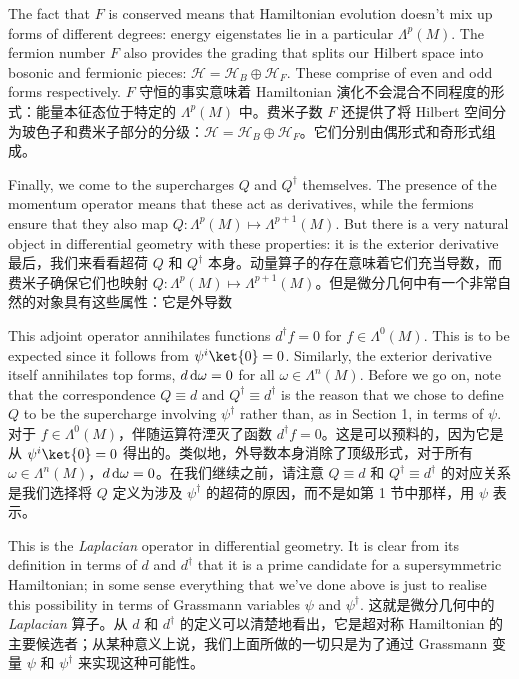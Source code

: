 \documentclass{article}
\begin{document}
\begin{paracol}{2}
The fact that $F$ is conserved means that Hamiltonian evolution doesn’t mix up forms of different degrees: energy eigenstates lie in a particular $\Lambda^{p}(M)$. The fermion number $F$ also provides the grading that splits our Hilbert space into bosonic and fermionic pieces: $\mathcal{H} = \mathcal{H}_B \oplus \mathcal{H}_F$. These comprise of even and odd forms respectively.
\switchcolumn
$F$ 守恒的事实意味着 Hamiltonian 演化不会混合不同程度的形式：能量本征态位于特定的 $\Lambda^{p}(M)$ 中。费米子数 $F$ 还提供了将 Hilbert 空间分为玻色子和费米子部分的分级：$\mathcal{H} = \mathcal{H}_B \oplus \mathcal{H}_F$。它们分别由偶形式和奇形式组成。
\switchcolumn*

Finally, we come to the supercharges $Q$ and $Q^{\dagger}$ themselves. The presence of the momentum operator means that these act as derivatives, while the fermions ensure that they also map $Q: \Lambda^p(M) \mapsto \Lambda^{p + 1}(M)$. But there is a very natural object in differential geometry with these properties: it is the exterior derivative
\switchcolumn
最后，我们来看看超荷 $Q$ 和 $Q^{\dagger}$ 本身。动量算子的存在意味着它们充当导数，而费米子确保它们也映射 $Q: \Lambda^p(M) \mapsto \Lambda^{p + 1}(M)$。但是微分几何中有一个非常自然的对象具有这些属性：它是外导数
\switchcolumn*

This adjoint operator annihilates functions $d^{\dagger} f = 0$ for $f \in \Lambda^0(M)$. This is to be expected since it follows from $\psi^i \ket{0} = 0$. Similarly, the exterior derivative itself annihilates top forms, $d\odif{\omega} = 0$ for all $\omega \in \Lambda^n(M)$. Before we go on, note that the correspondence $Q \equiv d$ and $Q^{\dagger} \equiv d^{\dagger}$ is the reason that we chose to define $Q$ to be the supercharge involving $\psi^{\dagger}$ rather than, as in Section 1, in terms of $\psi$.
\switchcolumn
对于 $f \in \Lambda^0(M)$，伴随运算符湮灭了函数 $d^{\dagger} f = 0$。这是可以预料的，因为它是从 $\psi^i \ket{0} = 0$ 得出的。类似地，外导数本身消除了顶级形式，对于所有 $\omega \in \Lambda^n(M)$，$d\odif{\omega} = 0$。在我们继续之前，请注意 $Q \equiv d$ 和 $Q^{\dagger} \equiv d^{\dagger}$ 的对应关系是我们选择将 $Q$ 定义为涉及 $\psi^{\dagger}$ 的超荷的原因，而不是如第 1 节中那样，用 $\psi$ 表示。
\switchcolumn*

This is the \textit{Laplacian} operator in differential geometry. It is clear from its definition in terms of $d$ and $d^{\dagger}$ that it is a prime candidate for a supersymmetric Hamiltonian; in some sense everything that we’ve done above is just to realise this possibility in terms of Grassmann variables $\psi$ and $\psi^{\dagger}$.
\switchcolumn
这就是微分几何中的 \textit{Laplacian} 算子。从 $d$ 和 $d^{\dagger}$ 的定义可以清楚地看出，它是超对称 Hamiltonian 的主要候选者；从某种意义上说，我们上面所做的一切只是为了通过 Grassmann 变量 $\psi$ 和 $\psi^{\dagger}$ 来实现这种可能性。
\switchcolumn*


\end{paracol}
\end{document}
